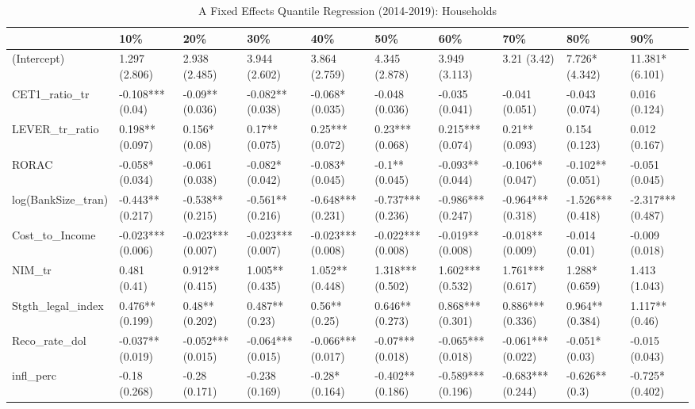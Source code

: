 \begin{table}[ht]
\centering
\caption{A Fixed Effects Quantile Regression (2014-2019): Households} 
\begingroup\small
\begin{tabular}{llllllllll}
  \toprule
 & 10\% & 20\% & 30\% & 40\% & 50\% & 60\% & 70\% & 80\% & 90\% \\ 
  \midrule
(Intercept) & 1.297 (2.806) & 2.938 (2.485) & 3.944 (2.602) & 3.864 (2.759) & 4.345 (2.878) & 3.949 (3.113) & 3.21 (3.42) & 7.726* (4.342) & 11.381* (6.101) \\ 
  CET1\_ratio\_tr & -0.108*** (0.04) & -0.09** (0.036) & -0.082** (0.038) & -0.068* (0.035) & -0.048 (0.036) & -0.035 (0.041) & -0.041 (0.051) & -0.043 (0.074) & 0.016 (0.124) \\ 
  LEVER\_tr\_ratio & 0.198** (0.097) & 0.156* (0.08) & 0.17** (0.075) & 0.25*** (0.072) & 0.23*** (0.068) & 0.215*** (0.074) & 0.21** (0.093) & 0.154 (0.123) & 0.012 (0.167) \\ 
  RORAC & -0.058* (0.034) & -0.061 (0.038) & -0.082* (0.042) & -0.083* (0.045) & -0.1** (0.045) & -0.093** (0.044) & -0.106** (0.047) & -0.102** (0.051) & -0.051 (0.045) \\ 
  log(BankSize\_tran) & -0.443** (0.217) & -0.538** (0.215) & -0.561** (0.216) & -0.648*** (0.231) & -0.737*** (0.236) & -0.986*** (0.247) & -0.964*** (0.318) & -1.526*** (0.418) & -2.317*** (0.487) \\ 
  Cost\_to\_Income & -0.023*** (0.006) & -0.023*** (0.007) & -0.023*** (0.007) & -0.023*** (0.008) & -0.022*** (0.008) & -0.019** (0.008) & -0.018** (0.009) & -0.014 (0.01) & -0.009 (0.018) \\ 
  NIM\_tr & 0.481 (0.41) & 0.912** (0.415) & 1.005** (0.435) & 1.052** (0.448) & 1.318*** (0.502) & 1.602*** (0.532) & 1.761*** (0.617) & 1.288* (0.659) & 1.413 (1.043) \\ 
  Stgth\_legal\_index & 0.476** (0.199) & 0.48** (0.202) & 0.487** (0.23) & 0.56** (0.25) & 0.646** (0.273) & 0.868*** (0.301) & 0.886*** (0.336) & 0.964** (0.384) & 1.117** (0.46) \\ 
  Reco\_rate\_dol & -0.037** (0.019) & -0.052*** (0.015) & -0.064*** (0.015) & -0.066*** (0.017) & -0.07*** (0.018) & -0.065*** (0.018) & -0.061*** (0.022) & -0.051* (0.03) & -0.015 (0.043) \\ 
  infl\_perc & -0.18 (0.268) & -0.28 (0.171) & -0.238 (0.169) & -0.28* (0.164) & -0.402** (0.186) & -0.589*** (0.196) & -0.683*** (0.244) & -0.626** (0.3) & -0.725* (0.402) \\ 

\end{tabular}
\end{table}
